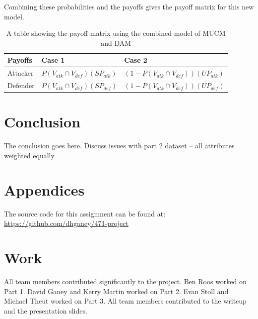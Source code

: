 \documentclass[11pt,journal]{IEEEtran}
\begin{document}
Combining these probabilities and the payoffs gives the payoff matrix for this new model.
 \begin{table}[H]
{\renewcommand{\arraystretch}{1.2}%
\begin{tabular}{ |l |l | l | }
\hline
Payoffs & Case 1  & Case 2  \\ \hline
Attacker & $P(V_{atk}\cap V_{def})(SP_{atk})$ & $(1-P(V_{atk}\cap V_{def}))(UP_{atk})$    \\ \hline
 Defender  & $P(V_{atk}\cap V_{def})(SP_{def})$ & $(1-P(V_{atk}\cap V_{def}))(UP_{def})$  \\ \hline

\end{tabular}} \quad
\caption{A table showing the payoff matrix using the combined model of MUCM and DAM} 
\end{table}


\section{Conclusion} \label{conclusion}
The conclusion goes here.
Discuss issues with part 2 dataset -- all attributes weighted equally


\section*{Appendices}

The source code for this assignment can be found at:
\url{https://github.com/dhganey/471-project}


\section*{Work}
All team members contributed significantly to the project. Ben Roos worked on Part 1. David Ganey and Kerry Martin worked on Part 2. Evan Stoll and Michael Theut worked on Part 3. All team members contributed to the writeup and the presentation slides.





\end{document}
